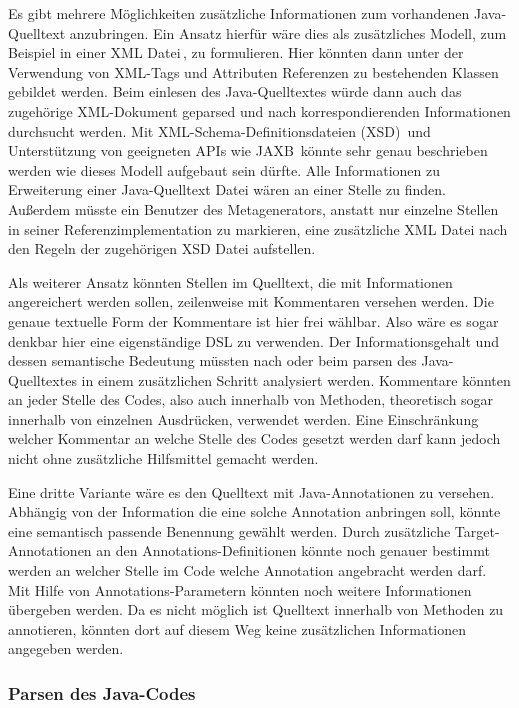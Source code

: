 \documentclass[12pt,oneside,a4paper,parskip]{scrbook}
\begin{document}
Es gibt mehrere Möglichkeiten zusätzliche Informationen zum vorhandenen Java-Quelltext anzubringen. Ein Ansatz hierfür wäre dies als zusätzliches Modell, zum Beispiel in einer XML Datei\,\cite{xml2008}, zu formulieren. Hier könnten dann unter der Verwendung von XML-Tags und Attributen Referenzen zu bestehenden Klassen gebildet werden. Beim einlesen des Java-Quelltextes würde dann auch das zugehörige XML-Dokument geparsed und nach korrespondierenden Informationen durchsucht werden. Mit XML-Schema-Definitionsdateien (XSD)\,\cite{xsd2012} und Unterstützung von geeigneten APIs wie JAXB\,\cite{jaxb} könnte sehr genau beschrieben werden wie dieses Modell aufgebaut sein dürfte. Alle Informationen zu Erweiterung einer Java-Quelltext Datei wären an einer Stelle zu finden. Außerdem müsste ein Benutzer des Metagenerators, anstatt nur einzelne Stellen in seiner Referenzimplementation zu markieren, eine zusätzliche XML Datei nach den Regeln der zugehörigen XSD Datei aufstellen.

Als weiterer Ansatz könnten Stellen im Quelltext, die mit Informationen angereichert werden sollen, zeilenweise mit Kommentaren versehen werden. Die genaue textuelle Form der Kommentare ist hier frei wählbar. Also wäre es sogar denkbar hier eine eigenständige DSL zu verwenden. Der Informationsgehalt und dessen semantische Bedeutung müssten nach oder beim parsen des Java-Quelltextes in einem zusätzlichen Schritt analysiert werden. Kommentare könnten an jeder Stelle des Codes, also auch innerhalb von Methoden, theoretisch sogar innerhalb von einzelnen Ausdrücken, verwendet werden. Eine Einschränkung welcher Kommentar an welche Stelle des Codes gesetzt werden darf kann jedoch nicht ohne zusätzliche Hilfsmittel gemacht werden.

Eine dritte Variante wäre es den Quelltext mit Java-Annotationen zu versehen. Abhängig von der Information die eine solche Annotation anbringen soll, könnte eine semantisch passende Benennung gewählt werden. Durch zusätzliche Target-Annotationen an den Annotations-Definitionen könnte noch genauer bestimmt werden an welcher Stelle im Code welche Annotation angebracht werden darf. Mit Hilfe von Annotations-Parametern könnten noch weitere Informationen übergeben werden. Da es nicht möglich ist Quelltext innerhalb von Methoden zu annotieren, könnten dort auf diesem Weg keine zusätzlichen Informationen angegeben werden.

\subsubsection{Parsen des Java-Codes}
\end{document}
